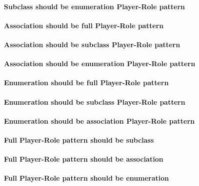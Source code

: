 \paragraph{Subclass should be enumeration Player-Role pattern}


\paragraph{Association should be full Player-Role pattern}


\paragraph{Association should be subclass Player-Role pattern}


\paragraph{Association should be enumeration Player-Role pattern}


\paragraph{Enumeration should be full Player-Role pattern}


\paragraph{Enumeration should be subclass Player-Role pattern}


\paragraph{Enumeration should be association Player-Role pattern}


\paragraph{Full Player-Role pattern should be subclass}


\paragraph{Full Player-Role pattern should be association}


\paragraph{Full Player-Role pattern should be enumeration}


